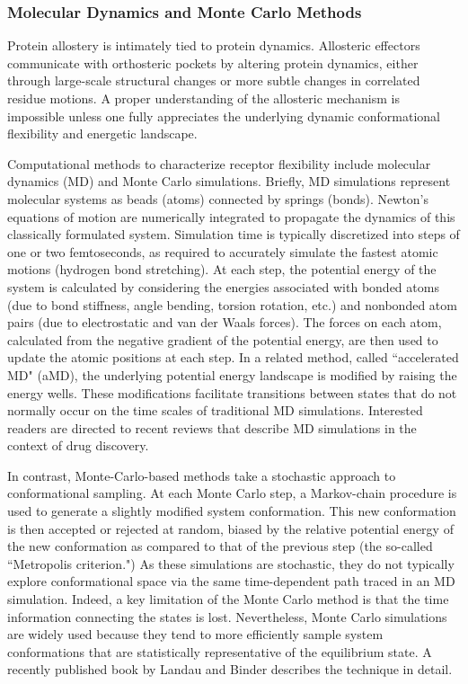\subsubsection{Molecular Dynamics and Monte Carlo Methods}
\par Protein allostery is intimately tied to protein dynamics. Allosteric effectors communicate with orthosteric pockets by altering protein dynamics, either through large-scale structural changes or more subtle changes in correlated residue motions. A proper understanding of the allosteric mechanism is impossible unless one fully appreciates the underlying dynamic conformational flexibility and energetic landscape.
\par Computational methods to characterize receptor flexibility include molecular dynamics (MD) and Monte Carlo simulations. Briefly, MD simulations represent molecular systems as beads (\eg atoms) connected by springs (\eg bonds). Newton’s equations of motion are numerically integrated to propagate the dynamics of this classically formulated system.\cite{Alder1959a,Rahman1964a,Karplus2002,Adcock2006} Simulation time is typically discretized into steps of one or two femtoseconds, as required to accurately simulate the fastest atomic motions (\ie hydrogen bond stretching). At each step, the potential energy of the system is calculated by considering the energies associated with bonded atoms (\eg due to bond stiffness, angle bending, torsion rotation, etc.) and nonbonded atom pairs (\eg due to electrostatic and van der Waals forces). The forces on each atom, calculated from the negative gradient of the potential energy, are then used to update the atomic positions at each step. In a related method, called ``accelerated MD" (aMD), \cite{Hamelberg2004,Wang2011,Miao2015a,Miao2015,Pierce2012a,Lindert2013a} the underlying potential energy landscape is modified by raising the energy wells. These modifications facilitate transitions between states that do not normally occur on the time scales of traditional MD simulations. Interested readers are directed to recent reviews that describe MD simulations in the context of drug discovery.\cite{Amaro2008,Amaro2010,Durrant2011b,Nichols2012a}
\par In contrast, Monte-Carlo-based methods take a stochastic approach to conformational sampling.\cite{Metropolis1953,HASTINGS1970} At each Monte Carlo step, a Markov-chain procedure is used to generate a slightly modified system conformation. This new conformation is then accepted or rejected at random, biased by the relative potential energy of the new conformation as compared to that of the previous step (the so-called ``Metropolis criterion."\cite{Metropolis1953}) As these simulations are stochastic, they do not typically explore conformational space via the same time-dependent path traced in an MD simulation. Indeed, a key limitation of the Monte Carlo method is that the time information connecting the states is lost. Nevertheless, Monte Carlo simulations are widely used because they tend to more efficiently sample system conformations that are statistically representative of the equilibrium state. A recently published book by Landau and Binder describes the technique in detail.\cite{Landau2009}
